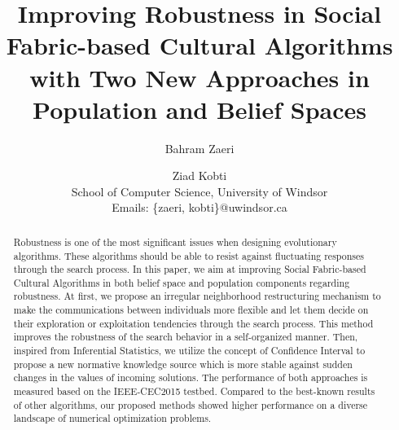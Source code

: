 \documentclass[letterpaper]{article}
\begin{document}
\title{Improving Robustness in Social Fabric-based Cultural Algorithms with Two New Approaches in Population and Belief Spaces}
\author{Bahram Zaeri \and Ziad Kobti\\
School of Computer Science, University of Windsor\\
Emails: \{zaeri, kobti\}@uwindsor.ca}

\maketitle
\begin{abstract}
Robustness is one of the most significant issues when designing evolutionary algorithms. These algorithms should be able to resist against fluctuating responses through the search process. In this paper, we aim at improving Social Fabric-based Cultural Algorithms in both belief space and population components regarding robustness. At first, we propose an irregular neighborhood restructuring mechanism to make the communications between individuals more flexible and let them decide on their exploration or exploitation tendencies through the search process. This method improves the robustness of the search behavior in a self-organized manner. Then, inspired from Inferential Statistics, we utilize the concept of Confidence Interval to propose a new normative knowledge source which is more stable against sudden changes in the values of incoming solutions. The performance of both approaches is measured based on the IEEE-CEC2015 testbed. Compared to the best-known results of other algorithms, our proposed methods showed higher performance on a diverse landscape of numerical optimization problems.
\end{abstract}
\end{document}
